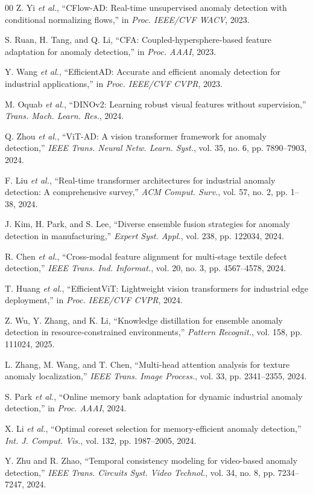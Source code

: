 \documentclass[journal]{IEEEtran}
\begin{document}
\begin{thebibliography}{00}
Z. Yi \textit{et al.}, ``CFlow-AD: Real-time unsupervised anomaly detection with conditional normalizing flows,'' in \textit{Proc. IEEE/CVF WACV}, 2023.

S. Ruan, H. Tang, and Q. Li, ``CFA: Coupled-hypersphere-based feature adaptation for anomaly detection,'' in \textit{Proc. AAAI}, 2023.

Y. Wang \textit{et al.}, ``EfficientAD: Accurate and efficient anomaly detection for industrial applications,'' in \textit{Proc. IEEE/CVF CVPR}, 2023.

M. Oquab \textit{et al.}, ``DINOv2: Learning robust visual features without supervision,'' \textit{Trans. Mach. Learn. Res.}, 2024.

Q. Zhou \textit{et al.}, ``ViT-AD: A vision transformer framework for anomaly detection,'' \textit{IEEE Trans. Neural Netw. Learn. Syst.}, vol. 35, no. 6, pp. 7890--7903, 2024.

F. Liu \textit{et al.}, ``Real-time transformer architectures for industrial anomaly detection: A comprehensive survey,'' \textit{ACM Comput. Surv.}, vol. 57, no. 2, pp. 1--38, 2024.

J. Kim, H. Park, and S. Lee, ``Diverse ensemble fusion strategies for anomaly detection in manufacturing,'' \textit{Expert Syst. Appl.}, vol. 238, pp. 122034, 2024.

R. Chen \textit{et al.}, ``Cross-modal feature alignment for multi-stage textile defect detection,'' \textit{IEEE Trans. Ind. Informat.}, vol. 20, no. 3, pp. 4567--4578, 2024.

T. Huang \textit{et al.}, ``EfficientViT: Lightweight vision transformers for industrial edge deployment,'' in \textit{Proc. IEEE/CVF CVPR}, 2024.

Z. Wu, Y. Zhang, and K. Li, ``Knowledge distillation for ensemble anomaly detection in resource-constrained environments,'' \textit{Pattern Recognit.}, vol. 158, pp. 111024, 2025.

L. Zhang, M. Wang, and T. Chen, ``Multi-head attention analysis for texture anomaly localization,'' \textit{IEEE Trans. Image Process.}, vol. 33, pp. 2341--2355, 2024.

S. Park \textit{et al.}, ``Online memory bank adaptation for dynamic industrial anomaly detection,'' in \textit{Proc. AAAI}, 2024.

X. Li \textit{et al.}, ``Optimal coreset selection for memory-efficient anomaly detection,'' \textit{Int. J. Comput. Vis.}, vol. 132, pp. 1987--2005, 2024.

Y. Zhu and R. Zhao, ``Temporal consistency modeling for video-based anomaly detection,'' \textit{IEEE Trans. Circuits Syst. Video Technol.}, vol. 34, no. 8, pp. 7234--7247, 2024.

\end{thebibliography}
\end{document}
